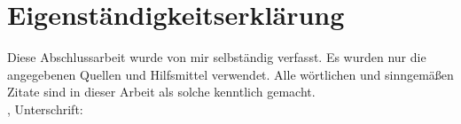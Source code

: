 \section*{Eigenständigkeitserklärung}
Diese Abschlussarbeit wurde von mir selbständig verfasst. Es wurden nur die angegebenen Quellen und Hilfsmittel verwendet. Alle wörtlichen und sinngemäßen Zitate sind in dieser Arbeit als solche kenntlich gemacht.\\[3em]
\parindent0mm
\vspace{2cm}
\ort, \abgabedatum \hspace{2cm}  Unterschrift: \\